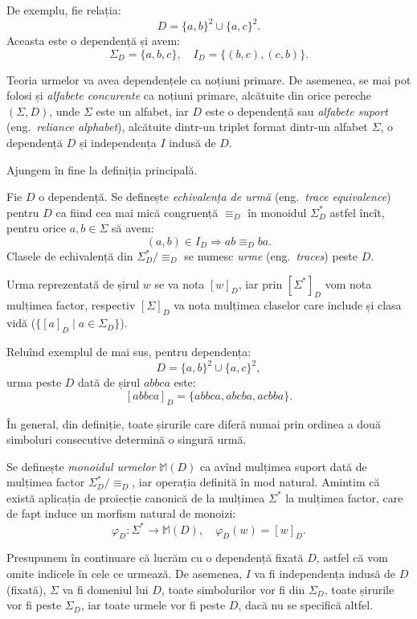 De exemplu, fie relația:
\[
    D = \{ a, b \}^2 \cup \{ a,c \}^2.
\]
Aceasta este o dependență și avem:
\[
    \Sigma_D = \{ a, b, c \}, \quad I_D = \{ (b,c), (c,b) \}.
\]

Teoria urmelor va avea dependențele ca noțiuni primare. De asemenea,
se mai pot folosi și \emph{alfabete concurente} ca noțiuni primare,
alcătuite din orice pereche $ (\Sigma, D) $, unde $ \Sigma $ este un
alfabet, iar $ D $ este o dependență sau \emph{alfabete suport}
(eng.\ \emph{reliance alphabet}), alcătuite dintr-un triplet format
dintr-un alfabet $ \Sigma $, o dependență $ D $ și independența $ I $
indusă de $ D $.

Ajungem în fine la definiția principală.

\begin{definition}\label{def:trace}
    Fie $ D $ o dependență. Se definește \emph{echivalența de urmă}
    (eng.\ \emph{trace equivalence}) pentru $ D $ ca fiind cea mai
    mică congruență $ \equiv_D $ în monoidul $ \Sigma^\ast_D $ astfel
    încît, pentru orice $ a, b \in \Sigma $ să avem:
    \[
        (a, b) \in I_D \Rightarrow ab \equiv_D ba.
    \]
    Clasele de echivalență din $ \Sigma^\ast_D/\equiv_D $ se numesc
    \emph{urme} (eng.\ \emph{traces}) peste $ D $.

    Urma reprezentată de șirul $ w $ se va nota $ [w]_D $, iar prin
    $ \left[ \Sigma^\ast \right]_D $ vom nota mulțimea factor,
    respectiv $ \left[ \Sigma \right]_D $ va nota mulțimea claselor care
    include și clasa vidă ($\{ [a]_D \mid a \in \Sigma_D \}$).
\end{definition}

Reluînd exemplul de mai sus, pentru dependența:
\[
    D = \{ a, b \}^2 \cup \{ a, c \}^2,
\]
urma peste $ D $ dată de șirul $ abbca $ este:
\[
    [abbca]_D = \{ abbca, abcba, acbba \}.
\]

În general, din definiție, toate șirurile care diferă numai prin ordinea
a două simboluri consecutive determină o singură urmă.

Se definește \emph{monoidul urmelor} $ \mathbb{M}(D) $ ca avînd mulțimea
suport dată de mulțimea factor $ \Sigma^\ast_D / \equiv_D $, iar operația
definită în mod natural. Amintim că există aplicația de proiecție canonică
de la mulțimea $ \Sigma^\ast $ la mulțimea factor, care de fapt induce un
morfism natural de monoizi:
\[
    \varphi_D : \Sigma^\ast \to \mathbb{M}(D), \quad \varphi_D(w) = [w]_D.
\]

Presupunem în continuare că lucrăm cu o dependență fixată $ D $, astfel că
vom omite indicele în cele ce urmează. De asemenea, $ I $ va fi independența
indusă de $ D $ (fixată), $ \Sigma $ va fi domeniul lui $ D $, toate
simbolurilor vor fi din $ \Sigma_D $, toate șirurile vor fi peste $ \Sigma_D $,
iar toate urmele vor fi peste $ D $, dacă nu se specifică altfel.

